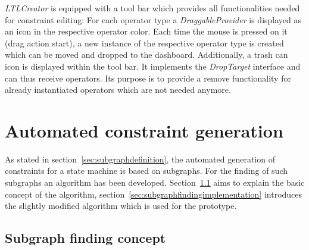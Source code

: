 
\emph{LTLCreator} is equipped with a tool bar which provides all functionalities needed for constraint editing: For each operator type a \emph{DraggableProvider} is displayed as an icon in the respective operator color. Each time the mouse is pressed on it (drag action start), a new instance of the respective operator type is created which can be moved and dropped to the dashboard. Additionally, a trash can icon is displayed within the tool bar. It implements the \emph{DropTarget} interface and can thus receive operators. Its purpose is to provide a remove functionality for already instantiated operators which are not needed anymore.









\section{Automated constraint generation}
\label{sec:prototype:automatedconstraintgeneration}

As stated in section~\ref{sec:subgraphdefinition}, the automated generation of constraints for a state machine is based on subgraphs. For the finding of such subgraphs an algorithm has been developed. Section~\ref{sec:subgraphfindingconcept} aims to explain the basic concept of the algorithm, section~\ref{sec:subgraphfindingimplementation} introduces the slightly modified algorithm which is used for the prototype.


\subsection{Subgraph finding concept}
\label{sec:subgraphfindingconcept}

